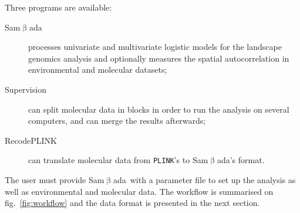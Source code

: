 \documentclass[a4paper,11pt]{article}
\newcommand{\smb}{\textsf{Sam$\upbeta$ada}}
\newcommand{\prog}[1]{\texttt{#1}}
\begin{document}
Three programs are available:
\begin{description}
\item[\smb] processes univariate and multivariate logistic models for the landscape genomics analysis and optionally measures the spatial autocorrelation in environmental and molecular datasets;
\item[Supervision] can split molecular data in blocks in order to run the analysis on several computers, and can merge the results afterwards;
\item[RecodePLINK] can translate molecular data from \prog{PLINK}'s to \smb's format.
\end{description}

The user must provide \smb\ with a parameter file to set up the analysis as well as environmental and molecular data.
The workflow is summarised on fig.~\ref{fig:workflow} and the data format is presented in the next section.
\end{document}
